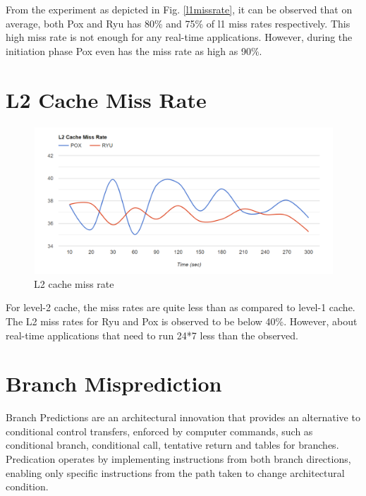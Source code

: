 From the experiment as depicted in Fig. \ref{l1missrate}, it can be observed that on average, both Pox and Ryu has 80\% and 75\% of l1 miss rates respectively. This high miss rate is not enough for any real-time applications. However, during the initiation phase Pox even has the miss rate as high as 90\%.

\section{L2 Cache Miss Rate}

\begin{figure}[!hbt]
    \centering
        \includegraphics[width=\textwidth,keepaspectratio]{images/l2_miss_rate.png}
       \caption{L2 cache miss rate}
        \label{l2missrate}
\end{figure}

For level-2 cache, the miss rates are quite less than as compared to level-1 cache. The L2 miss rates for Ryu and Pox is observed to be below 40\%. However, about real-time applications that need to run 24*7 less than the observed.

\section{Branch Misprediction}

Branch Predictions are an architectural innovation that provides an alternative to conditional control transfers, enforced by computer commands, such as conditional branch, conditional call, tentative return and tables for branches. Predication operates by implementing instructions from both branch directions, enabling only specific instructions from the path taken to change architectural condition.

